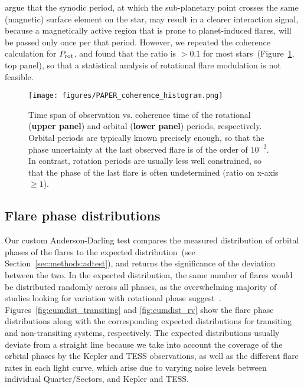 \documentclass[twocolumn]{aastex631}
\begin{document}
\citet{fischer2019timevariable} argue that the synodic period, at which the sub-planetary point crosses the same (magnetic) surface element on the star, may result in a clearer interaction signal, because a magnetically active region that is prone to planet-induced flares, will be passed only once per that period. However, we repeated the coherence calculation for $P_{\rm rot}$, and found that the ratio is $>0.1$ for most stars~(Figure~\ref{fig:coherence_hist}, top panel), so that a statistical analysis of rotational flare modulation is not feasible. 

\begin{figure}[ht!]
    \begin{centering}
        \texttt{[image: figures/PAPER\_coherence\_histogram.png]}
        \caption{
           Time span of observation vs. coherence time of the rotational (\textbf{upper panel}) and orbital (\textbf{lower panel}) periods, respectively. Orbital periods are typically known precisely enough, so that the phase uncertainty at the last observed flare is of the order of $10^{-2}$. In contrast, rotation periods are usually less well constrained, so that the phase of the last flare is often undetermined (ratio on x-axis $\geq 1$).
        }
        \label{fig:coherence_hist}
    \end{centering}
\end{figure}

\subsection{Flare phase distributions}
\label{sec:results:phasedist}
Our custom Anderson-Darling test compares the measured distribution of orbital phases of the flares to the expected distribution~(see Section~\ref{sec:methods:adtest}), and returns the significance of the deviation between the two. In the expected distribution, the same number of flares would be distributed randomly across all phases, as the overwhelming majority of studies looking for variation with rotational phase suggest~\citep[see, e.g.,][]{doyle2018investigating,howard2021evryflare}. Figures~\ref{fig:cumdist_transiting} and \ref{fig:cumdist_rv} show the flare phase distributions along with the corresponding expected distributions for transiting and non-transiting systems, respectively. The expected distributions usually deviate from a straight line because we take into account the coverage of the orbital phases by the Kepler and TESS observations, as well as the different flare rates in each light curve, which arise due to varying noise levels between individual Quarter/Sectors, and Kepler and TESS.
\end{document}
